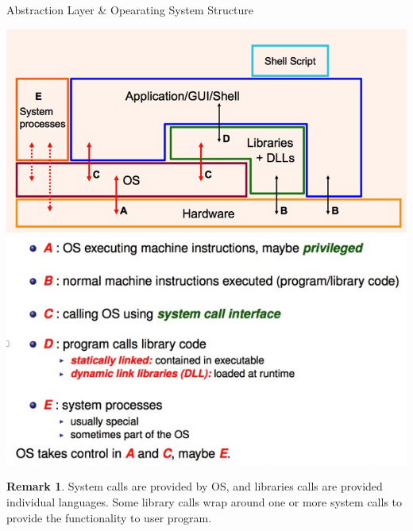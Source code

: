 \documentclass[12pt,a4paper]{article}
\theoremstyle{definition}
\newtheorem*{remark}{Remark}
\begin{document}
\begin{tcolorbox}
	\textsf{Abstraction Layer \& Opearating System Structure}
	
	\includegraphics[scale=0.3]{m1/operatingSystemStructure}
		\centering
	\includegraphics[scale=0.4]{m1/abstractionLayerDescription}
		\centering
\end{tcolorbox}

\begin{remark}
	System calls are provided by OS, and libraries calls are provided individual languages. Some library calls wrap around one or more system calls to provide the functionality to user program.
\end{remark}
\end{document}
